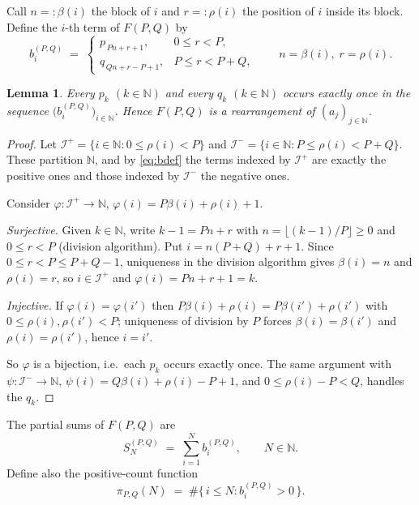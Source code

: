 \documentclass[11pt]{article}
\newtheorem{lemma}{Lemma}
\begin{document}
Call $n =: \beta(i)$ the block of $i$ and $r =: \rho(i)$ the position of $i$ inside its
block. Define the $i$-th term of $F(P,Q)$ by
\begin{equation}\label{eq:bdef}
b_i^{(P,Q)} \;=\;
\begin{cases}
p_{\,Pn + r + 1}, & 0 \le r < P, \\[4pt]
q_{\,Qn + r - P + 1}, & P \le r < P+Q ,
\end{cases}
\qquad n = \beta(i),\; r = \rho(i).
\end{equation}

\begin{lemma}\label{lem:bij}
Every $p_k$ $(k \in \mathbb{N})$ and every $q_k$ $(k \in \mathbb{N})$ occurs exactly once
in the sequence $\bigl(b_i^{(P,Q)}\bigr)_{i \in \mathbb{N}}$. Hence $F(P,Q)$ is a
rearrangement of $(a_j)_{j \in \mathbb{N}}$.
\end{lemma}

\begin{proof}
Let $\mathcal{I}^{+} = \{ i \in \mathbb{N} : 0 \le \rho(i) < P \}$ and
$\mathcal{I}^{-} = \{ i \in \mathbb{N} : P \le \rho(i) < P+Q \}$. These partition
$\mathbb{N}$, and by \eqref{eq:bdef} the terms indexed by $\mathcal{I}^{+}$ are exactly
the positive ones and those indexed by $\mathcal{I}^{-}$ the negative ones.

Consider $\varphi : \mathcal{I}^{+} \to \mathbb{N}$, $\varphi(i) = P\beta(i) + \rho(i) + 1$.

\emph{Surjective.} Given $k \in \mathbb{N}$, write $k - 1 = Pn + r$ with
$n = \lfloor (k-1)/P \rfloor \ge 0$ and $0 \le r < P$ (division algorithm). Put
$i = n(P+Q) + r + 1$. Since $0 \le r < P \le P+Q-1$, uniqueness in the division
algorithm gives $\beta(i) = n$ and $\rho(i) = r$, so $i \in \mathcal{I}^{+}$ and
$\varphi(i) = Pn + r + 1 = k$.

\emph{Injective.} If $\varphi(i) = \varphi(i')$ then $P\beta(i) + \rho(i) = P\beta(i') + \rho(i')$
with $0 \le \rho(i), \rho(i') < P$; uniqueness of division by $P$ forces
$\beta(i) = \beta(i')$ and $\rho(i) = \rho(i')$, hence $i = i'$.

So $\varphi$ is a bijection, i.e.\ each $p_k$ occurs exactly once. The same argument with
$\psi : \mathcal{I}^{-} \to \mathbb{N}$, $\psi(i) = Q\beta(i) + \rho(i) - P + 1$, and
$0 \le \rho(i) - P < Q$, handles the $q_k$.
\end{proof}

The partial sums of $F(P,Q)$ are
\[
S_N^{(P,Q)} \;=\; \sum_{i=1}^{N} b_i^{(P,Q)}, \qquad N \in \mathbb{N}.
\]
Define also the positive-count function
\[
\pi_{P,Q}(N) \;=\; \#\bigl\{\, i \le N : b_i^{(P,Q)} > 0 \,\bigr\}.
\]
\end{document}
